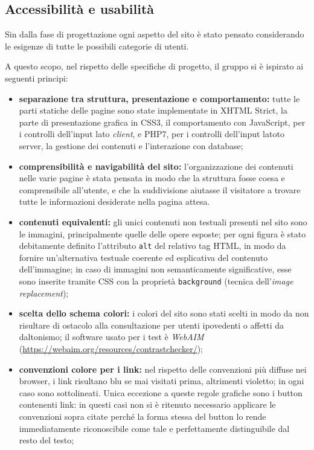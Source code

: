 \subsection{Accessibilità e usabilità}
\label{progettazione-accessibilità-usabilità}
Sin dalla fase di progettazione ogni aspetto del sito è stato pensato considerando le esigenze di tutte le possibili categorie di utenti. 


A questo scopo, nel rispetto delle specifiche di progetto, il gruppo si è ispirato ai seguenti principi:
\begin{itemize}
	\item \textbf{separazione tra struttura, presentazione e comportamento:} tutte le parti statiche delle pagine sono state implementate in XHTML Strict, la parte di presentazione grafica in CSS3, il comportamento con JavaScript, per i controlli dell'input lato \textit{client}, e PHP7, per i controlli dell'input latoto server, la gestione dei contenuti e l'interazione con database;
	\item \textbf{comprensibilità e navigabilità del sito:} l'organizzazione dei contenuti nelle varie pagine è stata pensata in modo che la struttura fosse coesa e comprensibile all'utente, e che la suddivisione aiutasse il visitatore a trovare tutte le informazioni desiderate nella pagina attesa. 
	\item \textbf{contenuti equivalenti:} gli unici contenuti non testuali presenti nel sito sono le immagini, principalmente quelle delle opere esposte; per ogni figura è stato debitamente definito l'attributo \texttt{alt} del relativo tag HTML, in modo da fornire un'alternativa testuale coerente ed esplicativa del contenuto dell'immagine; in caso di immagini non semanticamente significative, esse sono inserite tramite CSS con la proprietà \texttt{background} (tecnica dell'\textit{image replacement});
	\item \textbf{scelta dello schema colori:} i colori del sito sono stati scelti in modo da non risultare di ostacolo alla consultazione per utenti ipovedenti o affetti da daltonismo; il software usato per i test è \textit{WebAIM} (\url{https://webaim.org/resources/contrastchecker/}); 
	\item \textbf{convenzioni colore per i link:} nel rispetto delle convenzioni più diffuse nei browser, i link risultano blu se mai visitati prima, altrimenti violetto; in ogni caso sono sottolineati. Unica eccezione a queste regole grafiche sono i button contenenti link: in questi casi non si è ritenuto necessario applicare le convenzioni sopra citate perché la forma stessa del button lo rende immediatamente riconoscibile come tale e perfettamente distinguibile dal resto del testo;

\end{itemize}
